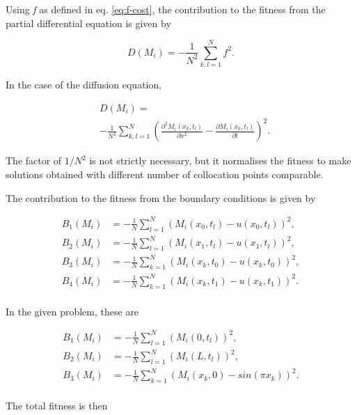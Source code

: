 \documentclass[multicolumn, 9pt]{extarticle}
\begin{document}
Using \textit{f} as defined in eq. \eqref{eq:f-cost}, the contribution to the fitness from the partial differential equation is given by

\begin{equation*}
	D(M_{i}) = -\frac{1}{N^{2}}\sum_{k, l=1}^{N} f^2.
\end{equation*}

In the case of the diffusion equation,

\begin{align*}
	 & D(M_{i}) =                                                                                                                                       \\
	 & - \frac{1}{N^{2}} \sum_{k, l=1}^{N} \left( \frac{\partial^2 M_i(x_k, t_l) }{\partial x^2} - \frac{\partial M_i(x_k, t_l)}{\partial t} \right) ^2.
\end{align*}

The factor of $1/N^{2}$ is not strictly necessary, but it normalises the fitness to make solutions obtained with different number of collocation points comparable.


The contribution to the fitness from the boundary conditions is given by

\begin{align*}
	B_1(M_{i}) & = -\frac{1}{N} \sum_{l=1}^{N} \left( M_i(x_0, t_l)- u(x_0, t_l)\right) ^2, \\
	B_2(M_{i}) & = -\frac{1}{N} \sum_{l=1}^{N} (M_i(x_1, t_l)- u(x_1, t_l))^2,              \\
	B_3(M_{i}) & = -\frac{1}{N} \sum_{k=1}^{N} (M_i(x_k, t_0)- u(x_k, t_0))^2,              \\
	B_4(M_{i}) & = -\frac{1}{N} \sum_{k=1}^{N} (M_i(x_k, t_1)- u(x_k, t_1))^2.              \\
\end{align*}

In the given problem, these are

\begin{align*}
	B_1(M_{i}) & = -\frac{1}{N} \sum_{l=1}^{N} \left( M_i(0, t_l)\right) ^2,     \\
	B_2(M_{i}) & = -\frac{1}{N} \sum_{l=1}^{N} (M_i(L, t_l))^2,                  \\
	B_3(M_{i}) & = -\frac{1}{N} \sum_{k=1}^{N} (M_i(x_k, 0) - sin(\pi x_{k}))^2. \\
\end{align*}


The total fitness is then
\end{document}
